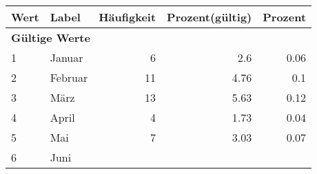      \begin{longtable}{lXrrr}
     \toprule
     \textbf{Wert} & \textbf{Label} & \textbf{Häufigkeit} & \textbf{Prozent(gültig)} & \textbf{Prozent} \\
     \endhead
     \midrule
     \multicolumn{5}{l}{\textbf{Gültige Werte}}\\

     1 &
     \multicolumn{1}{X}{ Januar   } &


       \num{6} &
       \num[round-mode=places,round-precision=2]{2.6} &
         \num[round-mode=places,round-precision=2]{0.06} \\

     2 &
     \multicolumn{1}{X}{ Februar   } &


       \num{11} &
       \num[round-mode=places,round-precision=2]{4.76} &
         \num[round-mode=places,round-precision=2]{0.1} \\

     3 &
     \multicolumn{1}{X}{ März   } &


       \num{13} &
       \num[round-mode=places,round-precision=2]{5.63} &
         \num[round-mode=places,round-precision=2]{0.12} \\

     4 &
     \multicolumn{1}{X}{ April   } &


       \num{4} &
       \num[round-mode=places,round-precision=2]{1.73} &
         \num[round-mode=places,round-precision=2]{0.04} \\

     5 &
     \multicolumn{1}{X}{ Mai   } &


       \num{7} &
       \num[round-mode=places,round-precision=2]{3.03} &
         \num[round-mode=places,round-precision=2]{0.07} \\

     6 &
     \multicolumn{1}{X}{ Juni   } &



\end{longtable}
